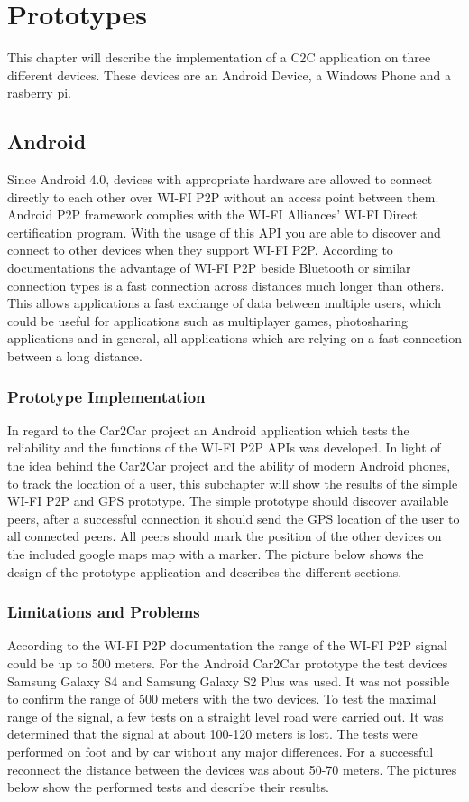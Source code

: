 \chapter{Prototypes}
\label{cha:Prototypes}
This chapter will describe the implementation of a C2C application on three different devices. These devices are an Android Device, a Windows Phone and a rasberry pi.

\section{Android}
Since Android 4.0, devices with appropriate hardware are allowed to connect directly to each other over WI-FI P2P without an access point between them. Android P2P framework complies with the WI-FI Alliances' WI-FI Direct certification program. With the usage of this API you are able to discover and connect to other devices when they support WI-FI P2P.  According to documentations the advantage of WI-FI P2P beside Bluetooth or similar connection types is a fast connection across distances much longer than others. This allows applications a fast exchange of data between multiple users, which could be useful for applications such as multiplayer games, photosharing applications and in general, all applications which are relying on a fast connection between a long distance.

\subsection*{Prototype Implementation}
\label{subsec:AndroidPrototype}
In regard to the Car2Car project an Android application which tests the reliability and the functions of the WI-FI P2P APIs was developed. In light of the idea behind the Car2Car project and the ability of modern Android phones, to track the location of a user, this subchapter will show the results of the simple WI-FI P2P and GPS prototype.
The simple prototype should discover available peers, after a successful connection it should send the GPS location of the user to all connected peers. All peers should mark the position of the other devices on the included google maps map with a marker. The picture below shows the design of the prototype application and describes the different sections.

\subsection*{Limitations and Problems}
\label{subsec:LimitationsProblems}
According to the WI-FI P2P documentation the range of the WI-FI P2P signal could be up to 500 meters. For the Android Car2Car prototype the test devices Samsung Galaxy S4 and Samsung Galaxy S2 Plus was used. It was not possible to confirm the range of 500 meters with the two devices. To test the maximal range of the signal, a few tests on a straight level road were carried out. It was determined that the signal at about 100-120 meters is lost. The tests were performed on foot and by car without any major differences. For a successful reconnect the distance between the devices was about 50-70 meters. The pictures below show the performed tests and describe their results.

